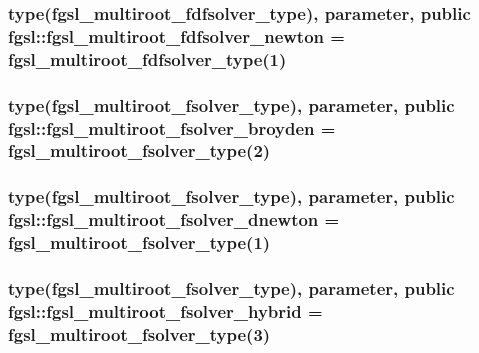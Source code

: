 \subsubsection[{fgsl\+\_\+multiroot\+\_\+fdfsolver\+\_\+newton}]{\setlength{\rightskip}{0pt plus 5cm}type({\bf fgsl\+\_\+multiroot\+\_\+fdfsolver\+\_\+type}), parameter, public fgsl\+::fgsl\+\_\+multiroot\+\_\+fdfsolver\+\_\+newton = {\bf fgsl\+\_\+multiroot\+\_\+fdfsolver\+\_\+type}(1)}\label{namespacefgsl_ae80cc34511a1cc786b0fb5617e3929ed}
\hypertarget{namespacefgsl_aaa51198ecabbc2cc4e7cd469492acedc}{}
\subsubsection[{fgsl\+\_\+multiroot\+\_\+fsolver\+\_\+broyden}]{\setlength{\rightskip}{0pt plus 5cm}type({\bf fgsl\+\_\+multiroot\+\_\+fsolver\+\_\+type}), parameter, public fgsl\+::fgsl\+\_\+multiroot\+\_\+fsolver\+\_\+broyden = {\bf fgsl\+\_\+multiroot\+\_\+fsolver\+\_\+type}(2)}\label{namespacefgsl_aaa51198ecabbc2cc4e7cd469492acedc}
\hypertarget{namespacefgsl_a1621295c3bf584aab577fe54f3a89fb0}{}
\subsubsection[{fgsl\+\_\+multiroot\+\_\+fsolver\+\_\+dnewton}]{\setlength{\rightskip}{0pt plus 5cm}type({\bf fgsl\+\_\+multiroot\+\_\+fsolver\+\_\+type}), parameter, public fgsl\+::fgsl\+\_\+multiroot\+\_\+fsolver\+\_\+dnewton = {\bf fgsl\+\_\+multiroot\+\_\+fsolver\+\_\+type}(1)}\label{namespacefgsl_a1621295c3bf584aab577fe54f3a89fb0}
\hypertarget{namespacefgsl_acca2b12319b40798b2dc4dd347fcc4b5}{}
\subsubsection[{fgsl\+\_\+multiroot\+\_\+fsolver\+\_\+hybrid}]{\setlength{\rightskip}{0pt plus 5cm}type({\bf fgsl\+\_\+multiroot\+\_\+fsolver\+\_\+type}), parameter, public fgsl\+::fgsl\+\_\+multiroot\+\_\+fsolver\+\_\+hybrid = {\bf fgsl\+\_\+multiroot\+\_\+fsolver\+\_\+type}(3)}\label{namespacefgsl_acca2b12319b40798b2dc4dd347fcc4b5}
\hypertarget{namespacefgsl_abd283e94024c75208f98eb64fd4a8833}{}
